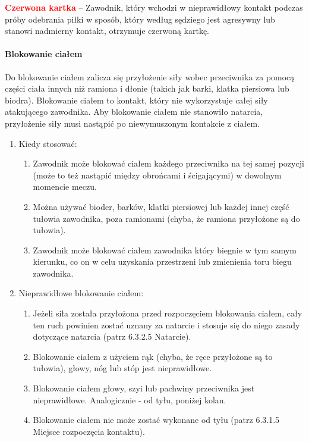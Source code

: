 \documentclass[12pt]{article}
\newcommand\redcard[1]{\bgroup\textcolor{red}{\textbf{#1}}}
\begin{document}
\redcard{Czerwona kartka} -- Zawodnik, który wchodzi w nieprawidłowy kontakt
podczas próby odebrania piłki w sposób, który według sędziego jest
agresywny lub stanowi nadmierny kontakt, otrzymuje czerwoną kartkę.

\paragraph{Blokowanie ciałem}
Do blokowanie ciałem zalicza się
przyłożenie siły wobec przeciwnika za pomocą części ciała innych niż
ramiona i dłonie (takich jak barki, klatka piersiowa lub biodra).
Blokowanie ciałem to kontakt, który nie wykorzystuje całej siły
atakującego zawodnika. Aby blokowanie ciałem nie stanowiło natarcia,
przyłożenie siły musi nastąpić po niewymuszonym kontakcie z ciałem.

\begin{enumerate}
	\item
	      Kiedy stosować:

	      \begin{enumerate}
		      \item
		            Zawodnik może blokować ciałem każdego przeciwnika na tej samej
		            pozycji (może to też nastąpić między obrońcami i ścigającymi) w
		            dowolnym momencie meczu.
		      \item
		            Można używać bioder, barków, klatki piersiowej lub każdej innej
		            część tułowia zawodnika, poza ramionami (chyba, że ramiona
		            przyłożone są do tułowia).
		      \item
		            Zawodnik może blokować ciałem zawodnika który biegnie w tym samym
		            kierunku, co on w celu uzyskania przestrzeni lub zmienienia toru
		            biegu zawodnika.
	      \end{enumerate}
	\item
	      Nieprawidłowe blokowanie ciałem:

	      \begin{enumerate}
		      \item
		            Jeżeli siła została przyłożona przed rozpoczęciem blokowania ciałem,
		            cały ten ruch powinien zostać uznany za natarcie i stosuje się do
		            niego zasady dotyczące natarcia (patrz 6.3.2.5 Natarcie).
		      \item
		            Blokowanie ciałem z użyciem rąk (chyba, że ręce przyłożone są to
		            tułowia), głowy, nóg lub stóp jest nieprawidłowe.
		      \item
		            Blokowanie ciałem głowy, szyi lub pachwiny przeciwnika jest
		            nieprawidłowe. Analogicznie - od tyłu, poniżej kolan.
		      \item
		            Blokowanie ciałem nie może zostać wykonane od tyłu (patrz 6.3.1.5
		            Miejsce rozpoczęcia kontaktu).
	      \end{enumerate}
\end{enumerate}
\end{document}
